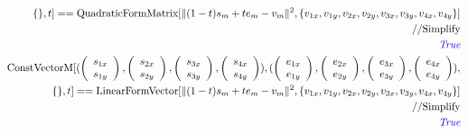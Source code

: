\documentclass[8pt]{article}
\begin{document}
\begin{screen}
\begin{eqnarray*}
 \{\}, t] == \text{QuadraticFormMatrix}[\|(1-t)s_m + t e_m - v_m\|^2,\{v_{1x},v_{1y},v_{2x},v_{2y},v_{3x},v_{3y},v_{4x},v_{4y}\}]\\
// \text{Simplify}\\
\text{\it \color{blue}True}\\
\text{ConstVectorM}[(\left(\begin{array}{c}
s_{1x}\\
s_{1y}\\
\end{array}\right),\left(\begin{array}{c}
s_{2x}\\
s_{2y}\\
\end{array}\right),\left(\begin{array}{c}
s_{3x}\\
s_{3y}\\
\end{array}\right),\left(\begin{array}{c}
s_{4x}\\
s_{4y}\\
\end{array}\right)),(\left(\begin{array}{c}
e_{1x}\\
e_{1y}\\
\end{array}\right),\left(\begin{array}{c}
e_{2x}\\
e_{2y}\\
\end{array}\right),\left(\begin{array}{c}
e_{3x}\\
e_{3y}\\
\end{array}\right),\left(\begin{array}{c}
e_{4x}\\
e_{4y}\\
\end{array}\right)),\\
 \{\}, t] == \text{LinearFormVector}[\|(1-t)s_m + t e_m - v_m\|^2,\{v_{1x},v_{1y},v_{2x},v_{2y},v_{3x},v_{3y},v_{4x},v_{4y}\}]\\
// \text{Simplify}\\
\text{\it \color{blue}True}
\end{eqnarray*}
\end{screen}
\end{document}
